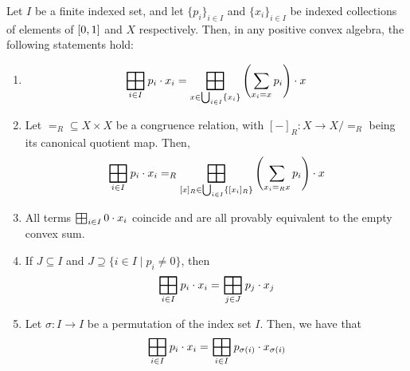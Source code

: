 \begin{proposition}\label{c4:prop:properties_of_positive_convex_algebras}
    Let $I$ be a finite indexed set, and let $\{p_i\}_{i \in I}$ and $\{x_i\}_{i \in I}$ be indexed collections of elements of $\interval{0}{1}$ and $X$ respectively. Then, in any positive convex algebra, the following statements hold:
    \begin{enumerate}
        \item
        $${\bigboxplus_{i \in I} p_i \cdot x_i} = {\bigboxplus_{x \in \bigcup_{i \in I} \{x_i\}} \left(\sum_{x_i = x} p_i\right)\cdot x}$$
        \item Let ${=_R} \subseteq {X \times X}$ be a congruence relation, with $[-]_R \colon X \to X/{=_R}$ being its canonical quotient map. Then, 
        $${\bigboxplus_{i \in I} p_i \cdot x_i} =_R {\bigboxplus_{[x]_R \in \bigcup_{i \in I} \left\{[x_i]_R\right\}} \left(\sum_{x_i =_R x} p_i\right)\cdot x}$$
        \item All terms $\bigboxplus_{i \in I } 0 \cdot x_i $ coincide and are all provably equivalent to the empty convex sum.
        \item If $J \subseteq I$ and $J \supseteq \{i \in I \mid p_i \neq 0\}$, then 
        $$
        \bigboxplus_{i \in I} p_i \cdot x_i = \bigboxplus_{j \in J} p_j \cdot x_j
        $$
        \item Let $\sigma \colon I \to I$ be a permutation of the index set $I$. Then, we have that
        $$
        	\bigboxplus_{i \in I} p_i \cdot x_i = \bigboxplus_{i \in I} p_{\sigma(i)} \cdot x_{\sigma(i)}
        $$
    \end{enumerate}
\end{proposition}
